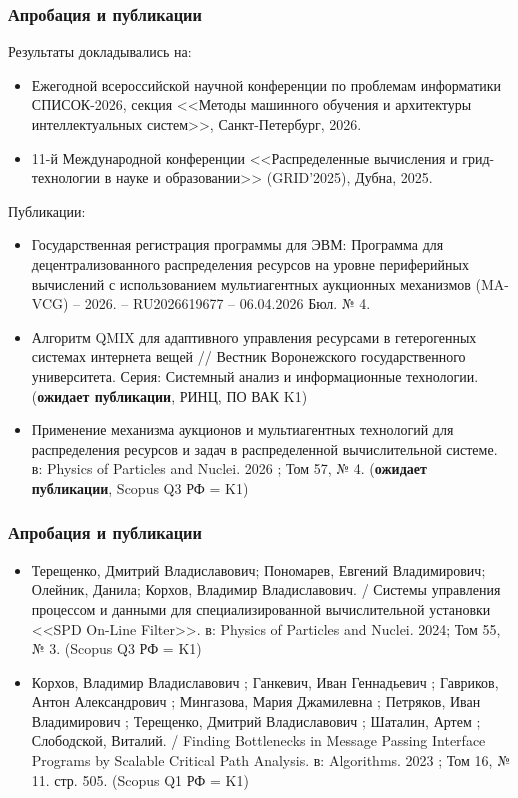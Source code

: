 \begin{frame}
    \frametitle{Апробация и публикации}
    \small
    Результаты докладывались на:
    \begin{itemize}
        \item Ежегодной всероссийской научной конференции по проблемам информатики СПИСОК-2026, секция <<Методы машинного обучения и архитектуры интеллектуальных систем>>, Санкт-Петербург, 2026.
        \item 11-й Международной конференции <<Распределенные вычисления и грид-технологии в науке и образовании>> (GRID'2025), Дубна, 2025.
    \end{itemize}
    Публикации:
    \begin{itemize}
	\item Государственная регистрация программы для ЭВМ: Программа для децентрализованного распределения ресурсов на уровне периферийных вычислений с использованием мультиагентных аукционных механизмов (MA-VCG) – 2026. – RU2026619677 – 06.04.2026 Бюл. № 4.
	\item Алгоритм QMIX для адаптивного управления ресурсами в гетерогенных системах интернета вещей // Вестник Воронежского государственного университета. Серия: Системный анализ и информационные технологии. (\textbf{ожидает публикации}, РИНЦ, ПО ВАК K1)
	\item Применение механизма аукционов и мультиагентных технологий для распределения ресурсов и задач в распределенной вычислительной системе. в: Physics of Particles and Nuclei. 2026 ; Том 57, № 4. (\textbf{ожидает публикации}, Scopus Q3 РФ = K1)
    \end{itemize}
\end{frame}

\begin{frame}
	\frametitle{Апробация и публикации}
	\small
	\begin{itemize}
		\item Терещенко, Дмитрий Владиславович; Пономарев, Евгений Владимирович; Олейник, Данила; Корхов, Владимир Владиславович. / Системы управления процессом и данными для специализированной вычислительной установки <<SPD On-Line Filter>>. в: Physics of Particles and Nuclei. 2024; Том 55, № 3.  (Scopus Q3 РФ = K1)
		\item Корхов, Владимир Владиславович ; Ганкевич, Иван Геннадьевич ; Гавриков, Антон Александрович ; Мингазова, Мария Джамилевна ; Петряков, Иван Владимирович ; Терещенко, Дмитрий Владиславович ; Шаталин, Артем ; Слободской, Виталий. / Finding Bottlenecks in Message Passing Interface Programs by Scalable Critical Path Analysis. в: Algorithms. 2023 ; Том 16, № 11. стр. 505. (Scopus Q1 РФ = K1)
	\end{itemize}
\end{frame}


